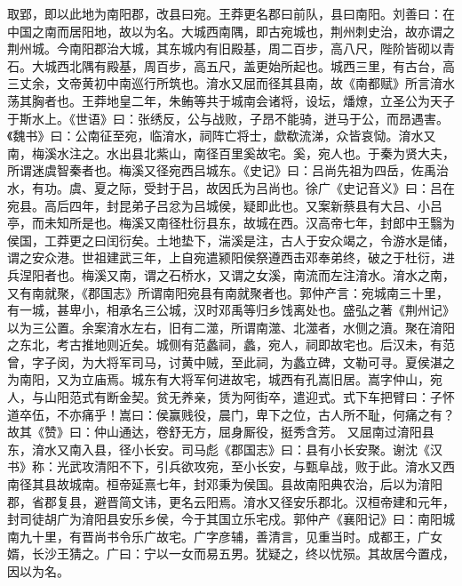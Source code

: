 \documentclass[12pt,UTF8]{ctexbook}
\begin{document}
取郢，即以此地为南阳郡，改县曰宛。王莽更名郡曰前队，县曰南阳。刘善曰：在中国之南而居阳地，故以为名。大城西南隅，即古宛城也，荆州刺史治，故亦谓之荆州城。今南阳郡治大城，其东城内有旧殿基，周二百步，高八尺，陛阶皆砌以青石。大城西北隅有殿基，周百步，高五尺，盖更始所起也。城西三里，有古台，高三丈余，文帝黄初中南巡行所筑也。淯水又屈而径其县南，故《南都赋》所言淯水荡其胸者也。王莽地皇二年，朱鲔等共于城南会诸将，设坛，燔燎，立圣公为天子于斯水上。《世语》曰：张绣反，公与战败，子昂不能骑，迸马于公，而昂遇害。《魏书》曰：公南征至宛，临淯水，祠阵亡将士，歔欷流涕，众皆哀恸。淯水又南，梅溪水注之。水出县北紫山，南径百里奚故宅。奚，宛人也。于秦为贤大夫，所谓迷虞智秦者也。梅溪又径宛西吕城东。《史记》曰：吕尚先祖为四岳，佐禹治水，有功。虞、夏之际，受封于吕，故因氏为吕尚也。徐广《史记音义》曰：吕在宛县。高后四年，封昆弟子吕忿为吕城侯，疑即此也。又案新蔡县有大吕、小吕亭，而未知所是也。梅溪又南径杜衍县东，故城在西。汉高帝七年，封郎中王翳为侯国，工莽更之曰闰衍矣。土地垫下，湍溪是注，古人于安众竭之，令游水是储，谓之安众港。世祖建武三年，上自宛遣颍阳侯祭遵西击邓奉弟终，破之于杜衍，进兵涅阳者也。梅溪又南，谓之石桥水，又谓之女溪，南流而左注淯水。淯水之南，又有南就聚，《郡国志》所谓南阳宛县有南就聚者也。郭仲产言：宛城南三十里，有一城，甚卑小，相承名三公城，汉时邓禹等归乡饯离处也。盛弘之著《荆州记》以为三公置。余案淯水左右，旧有二澨，所谓南澨、北澨者，水侧之濆。聚在淯阳之东北，考古推地则近矣。城侧有范蠡祠，蠡，宛人，祠即故宅也。后汉未，有范曾，字子闵，为大将军司马，讨黄中贼，至此祠，为蠡立碑，文勒可寻。夏侯湛之为南阳，又为立庙焉。城东有大将军何进故宅，城西有孔嵩旧居。嵩字仲山，宛人，与山阳范式有断金契。贫无养亲，赁为阿街卒，遣迎式。式下车把臂曰：子怀道卒伍，不亦痛乎！嵩曰：侯赢贱役，晨门，卑下之位，古人所不耻，何痛之有？故其《赞》曰：仲山通达，卷舒无方，屈身厮役，挺秀含芳。
又屈南过淯阳县东，淯水又南入县，径小长安。司马彪《郡国志》曰：县有小长安聚。谢沈《汉书》称：光武攻清阳不下，引兵欲攻宛，至小长安，与甄阜战，败于此。淯水又西南径其县故城南。桓帝延熹七年，封邓秉为侯国。县故南阳典农治，后以为淯阳郡，省郡复县，避晋简文讳，更名云阳焉。淯水又径安乐郡北。汉桓帝建和元年，封司徒胡广为淯阳县安乐乡侯，今于其国立乐宅戍。郭仲产《襄阳记》曰：南阳城南九十里，有晋尚书令乐广故宅。广字彦辅，善清言，见重当时。成都王，广女婿，长沙王猜之。广曰：宁以一女而易五男。犹疑之，终以忧殒。其故居今置戍，因以为名。
\end{document}
